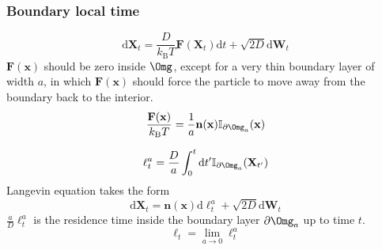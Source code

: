 \documentclass[9pt]{beamer}
\newcommand{\mrm}{\mathrm}
\begin{document}
\begin{frame}[noframenumbering]
\frametitle{Boundary local time}

$$ \mrm{d} \mathbf{X}_t = \frac{D}{k_\mrm{B} T} \mathbf{F}(\mathbf{X}_t) \mrm{d} t + \sqrt{2D} \mrm{d} \mathbf{W}_t $$
$\mathbf{F}(\mathbf{x})$ should be zero inside $\Omg$, except for a very thin boundary layer of width $a$, in which $\mathbf{F}(\mathbf{x})$ should force the particle to move away from the boundary back to the interior.
$$ \frac{\mathbf{F}(\mathbf{x})}{k_\mrm{B} T} = \frac{1}{a} \mathbf{n}(\mathbf{x}) \mathbb{I}_{\partial \Omg_a} (\mathbf{x}) $$

$$ \ell^a_t = \frac{D}{a} \int_0^t \mrm{d} t' \mathbb{I}_{\partial \Omg_a} (\mathbf{X}_{t'}) $$
Langevin equation takes the form
$$ \mrm{d} \mathbf{X}_t = \mathbf{n}(\mathbf{x}) \mrm{d} \ell^a_t + \sqrt{2D} \mrm{d} \mathbf{W}_t $$
$\frac{a}{D} \ell^a_t$ is the residence time inside the boundary layer $\partial \Omg_a$ up to time $t$.
$$ \ell_t = \lim_{a\to0} \ell^a_t $$

\end{frame}





\end{document}
